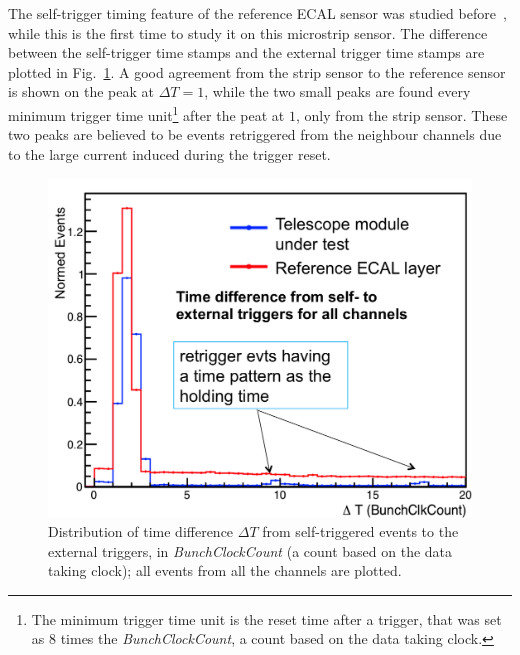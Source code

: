 \documentclass[journal]{IEEEtran}
\begin{document}
The self-trigger timing feature of the reference ECAL sensor was studied before~\cite{lycoris1},
while this is the first time to study it on this microstrip sensor.
The difference between the self-trigger time stamps and the external trigger time stamps are plotted in Fig.~\ref{fig:res1}.
A good agreement from the strip sensor to the reference sensor is shown on the peak at $\Delta T=1$,
while the two small peaks are found every minimum trigger time unit\footnote{The minimum trigger time unit is the reset time after a trigger, that was set as $8$ times the \textit{BunchClockCount}, a count based on the data taking clock.}
after the peat at $1$, only from the strip sensor.
These two peaks are believed to be events retriggered from the neighbour channels due to the large current induced during the trigger reset.
\begin{figure}[!ht]%
  \centering
  \includegraphics[width=0.8\linewidth]{pics/Res_pic1.png}
  \caption{Distribution of time difference $\Delta T$ from self-triggered events to the external triggers, in \textit{BunchClockCount} (a count based on the data taking clock); all events from all the channels are plotted. }%
\label{fig:res1}%
\end{figure}
\end{document}
